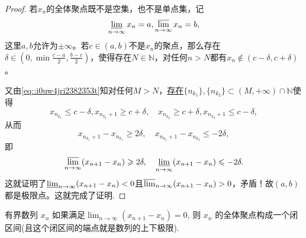 \documentclass[../../main.tex]{subfiles}
\begin{document}
\begin{proof}
若\( x_n \)的全体聚点既不是空集，也不是单点集，记
\begin{align}
\varliminf_{n \to \infty} x_n = a, \varlimsup_{n \to \infty} x_n = b, \label{eq::i0uw4jri2382353t}
\end{align}
这里\( a,b \)允许为\( \pm \infty \)。若\( c \in (a,b) \)不是\( x_n \)的聚点，那么存在\( \delta \in (0,\min{\frac{c-a}{2},\frac{b-c}{2}}) \)，使得存在\( N \in \mathbb{N} \)，对任何\( n > N \)都有\( x_n \notin (c - \delta, c + \delta) \)。

又由\eqref{eq::i0uw4jri2382353t}知对任何\( M > N \)，\hyperlink{n1n2子列存在的原因}{存在\( \{n_{k_1}\}, \{n_{k_2}\} \subset (M,+\infty)\cap \mathbb{N} \)}使得
\[
x_{n_{k_1}} \leqslant c - \delta, x_{n_{k_1} + 1} \geqslant c + \delta,\quad x_{n_{k_2}} \geqslant c + \delta, x_{n_{k_2} + 1} \leqslant c - \delta,
\]
从而
\[
x_{n_{k_1} + 1} - x_{n_{k_1}} \geqslant 2\delta,\quad  x_{n_{k_2} + 1} - x_{n_{k_2}} \leqslant -2\delta,
\]
即
\[
\varlimsup_{n \to \infty} (x_{n+1} - x_n) \geqslant 2\delta, \quad  \varliminf_{n \to \infty} (x_{n+1} - x_n) \leqslant -2\delta.
\]
这就证明了\( \varliminf_{n \to \infty} (x_{n+1} - x_n) < 0 \)且\( \varlimsup_{n \to \infty} (x_{n+1} - x_n) > 0 \)，矛盾！故\( (a,b) \)都是极限点。这就完成了证明.

\end{proof}

\begin{corollary}\label{corollary:有界数列差分极限为0则其闭包一定是闭区间}
有界数列 \( x_n \) 如果满足$\lim_{n \to \infty} (x_{n+1} - x_n) = 0$,
则 \( x_n \) 的全体聚点构成一个闭区间(且这个闭区间的端点就是数列的上下极限).
\end{corollary}
\end{document}
